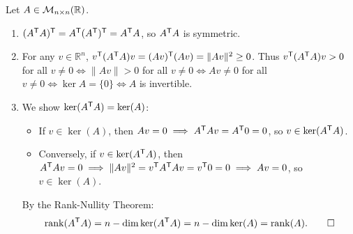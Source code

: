 \begin{exercisesolution}
\label{sol:gram_matrix_properties}
Let $A \in \mathcal{M}_{n \times n}(\mathbb{R})$.
\begin{enumerate}[label=\textbf{(\alph*)}]
    \item $(A^{\mathsf{T}} A)^{\mathsf{T}} = A^{\mathsf{T}} (A^{\mathsf{T}})^{\mathsf{T}} = A^{\mathsf{T}} A$, so $A^{\mathsf{T}} A$ is symmetric.

    \item For any $v \in \mathbb{R}^n$, $v^{\mathsf{T}} (A^{\mathsf{T}} A) v = (Av)^{\mathsf{T}} (Av) = \|Av\|^2 \ge 0$.
    Thus $v^{\mathsf{T}} (A^{\mathsf{T}} A) v > 0$ for all $v \ne 0 \iff \|Av\| > 0$ for all $v \ne 0 \iff Av \ne 0$ for all $v \ne 0 \iff \ker A = \{0\} \iff A$ is invertible.

    \item We show $\ker(A^{\mathsf{T}} A) = \ker(A)$:
    \begin{itemize}
        \item If $v \in \ker(A)$, then $Av = 0 \implies A^{\mathsf{T}} A v = A^{\mathsf{T}} 0 = 0$, so $v \in \ker(A^{\mathsf{T}} A)$.
        \item Conversely, if $v \in \ker(A^{\mathsf{T}} A)$, then $A^{\mathsf{T}} A v = 0 \implies \|Av\|^2 = v^{\mathsf{T}} A^{\mathsf{T}} A v = v^{\mathsf{T}} 0 = 0 \implies Av = 0$, so $v \in \ker(A)$.
    \end{itemize}
    By the Rank-Nullity Theorem:
    \[
    \operatorname{rank}(A^{\mathsf{T}} A) = n - \dim\ker(A^{\mathsf{T}} A) = n - \dim\ker(A) = \operatorname{rank}(A). \qedhere
    \]
\end{enumerate}
\end{exercisesolution}

